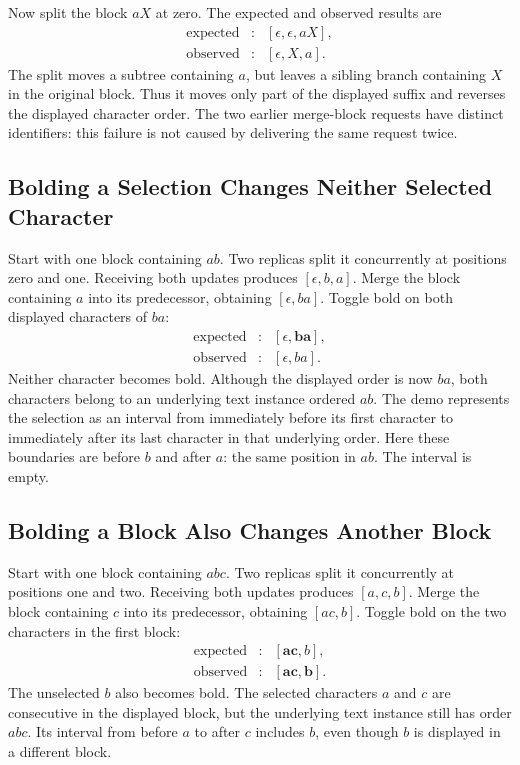 Now split the block $aX$ at zero. The expected and observed results are
\[
\begin{array}{rcl}
\text{expected}&:&[\epsilon,\epsilon,aX],\\
\text{observed}&:&[\epsilon,X,a].
\end{array}
\]
The split moves a subtree containing $a$, but leaves a sibling branch
containing $X$ in the original block. Thus it moves only part of the
displayed suffix and reverses the displayed character order. The two earlier
merge-block requests have distinct identifiers: this failure is not caused
by delivering the same request twice.

\subsection{Bolding a Selection Changes Neither Selected Character}
\label{app:notion-empty-bold-bug}

Start with one block containing $ab$. Two replicas split it concurrently
at positions zero and one. Receiving both updates produces
$[\epsilon,b,a]$. Merge the block containing $a$ into its predecessor,
obtaining $[\epsilon,ba]$. Toggle bold on both displayed characters of $ba$:
\[
\begin{array}{rcl}
\text{expected}&:&[\epsilon,\mathbf{ba}],\\
\text{observed}&:&[\epsilon,ba].
\end{array}
\]
Neither character becomes bold. Although the displayed order is now $ba$,
both characters belong to an underlying text instance ordered $ab$.
The demo represents the selection as an interval from immediately before
its first character to immediately after its last character in that
underlying order. Here these boundaries are before $b$ and after $a$:
the same position in $ab$. The interval is empty.

\subsection{Bolding a Block Also Changes Another Block}
\label{app:notion-excess-bold-bug}

Start with one block containing $abc$. Two replicas split it concurrently
at positions one and two. Receiving both updates produces $[a,c,b]$.
Merge the block containing $c$ into its predecessor, obtaining $[ac,b]$.
Toggle bold on the two characters in the first block:
\[
\begin{array}{rcl}
\text{expected}&:&[\mathbf{ac},b],\\
\text{observed}&:&[\mathbf{ac},\mathbf b].
\end{array}
\]
The unselected $b$ also becomes bold. The selected characters $a$ and $c$
are consecutive in the displayed block, but the underlying text instance
still has order $abc$. Its interval from before $a$ to after $c$ includes
$b$, even though $b$ is displayed in a different block.

